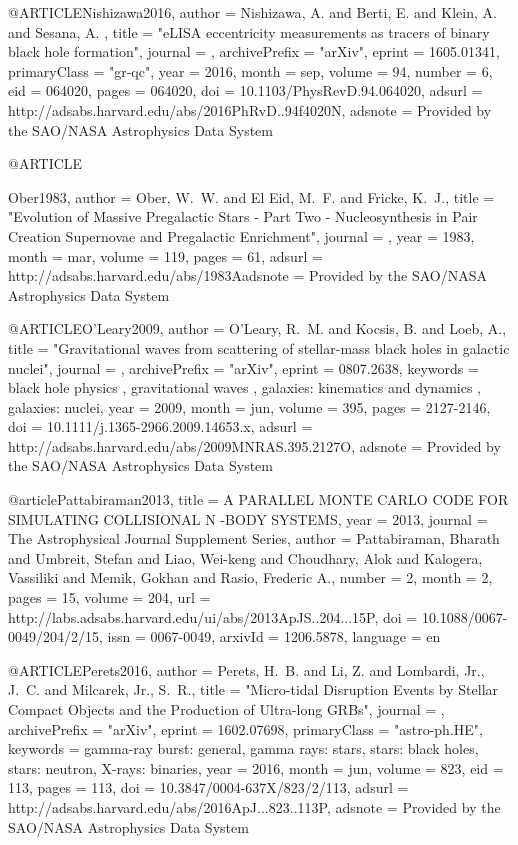 \documentclass[twocolumn,tighten]{aastex63}
\begin{document}
{{{{{@ARTICLE{Nishizawa2016,
   author = {{Nishizawa}, A. and {Berti}, E. and {Klein}, A. and {Sesana}, A.
	},
    title = "{eLISA eccentricity measurements as tracers of binary black hole formation}",
  journal = {\prd},
archivePrefix = "arXiv",
   eprint = {1605.01341},
 primaryClass = "gr-qc",
     year = 2016,
    month = sep,
   volume = 94,
   number = 6,
      eid = {064020},
    pages = {064020},
      doi = {10.1103/PhysRevD.94.064020},
   adsurl = {http://adsabs.harvard.edu/abs/2016PhRvD..94f4020N},
  adsnote = {Provided by the SAO/NASA Astrophysics Data System}
}

@ARTICLE{Ober1983,
   author = {{Ober}, W.~W. and {El Eid}, M.~F. and {Fricke}, K.~J.},
    title = "{Evolution of Massive Pregalactic Stars - Part Two - Nucleosynthesis in Pair Creation Supernovae and Pregalactic Enrichment}",
  journal = {\aap},
     year = 1983,
    month = mar,
   volume = 119,
    pages = {61},
   adsurl = {http://adsabs.harvard.edu/abs/1983Aadsnote = {Provided by the SAO/NASA Astrophysics Data System}
}

@ARTICLE{O'Leary2009,
   author = {{O'Leary}, R.~M. and {Kocsis}, B. and {Loeb}, A.},
    title = "{Gravitational waves from scattering of stellar-mass black holes in galactic nuclei}",
  journal = {\mnras},
archivePrefix = "arXiv",
   eprint = {0807.2638},
 keywords = {black hole physics , gravitational waves , galaxies: kinematics and dynamics , galaxies: nuclei},
     year = 2009,
    month = jun,
   volume = 395,
    pages = {2127-2146},
      doi = {10.1111/j.1365-2966.2009.14653.x},
   adsurl = {http://adsabs.harvard.edu/abs/2009MNRAS.395.2127O},
  adsnote = {Provided by the SAO/NASA Astrophysics Data System}
}

@article{Pattabiraman2013,
    title = {{A PARALLEL MONTE CARLO CODE FOR SIMULATING COLLISIONAL N -BODY SYSTEMS}},
    year = {2013},
    journal = {The Astrophysical Journal Supplement Series},
    author = {Pattabiraman, Bharath and Umbreit, Stefan and Liao, Wei-keng and Choudhary, Alok and Kalogera, Vassiliki and Memik, Gokhan and Rasio, Frederic A.},
    number = {2},
    month = {2},
    pages = {15},
    volume = {204},
    url = {http://labs.adsabs.harvard.edu/ui/abs/2013ApJS..204...15P},
    doi = {10.1088/0067-0049/204/2/15},
    issn = {0067-0049},
    arxivId = {1206.5878},
    language = {en}
}

@ARTICLE{Perets2016,
   author = {{Perets}, H.~B. and {Li}, Z. and {Lombardi}, Jr., J.~C. and 
	{Milcarek}, Jr., S.~R.},
    title = "{Micro-tidal Disruption Events by Stellar Compact Objects and the Production of Ultra-long GRBs}",
  journal = {\apj},
archivePrefix = "arXiv",
   eprint = {1602.07698},
 primaryClass = "astro-ph.HE",
 keywords = {gamma-ray burst: general, gamma rays: stars, stars: black holes, stars: neutron, X-rays: binaries},
     year = 2016,
    month = jun,
   volume = 823,
      eid = {113},
    pages = {113},
      doi = {10.3847/0004-637X/823/2/113},
   adsurl = {http://adsabs.harvard.edu/abs/2016ApJ...823..113P},
  adsnote = {Provided by the SAO/NASA Astrophysics Data System}
}

}}}}}}
\end{document}
